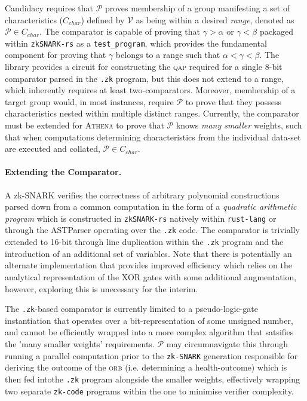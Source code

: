 \documentclass{article}
\begin{document}
				Candidacy requires that $\mathcal{P}$ proves membership of a group manifesting a set of characteristics ($C_{char}$) defined by $\mathcal{V}$ as being  within a desired \textit{range}, denoted as $\mathcal{P} \in C_{char}$. The comparator is capable of proving that $\gamma > \alpha$ or $\gamma < \beta$ packaged within \texttt{zkSNARK-rs} as a \texttt{test\_program}, which provides the fundamental component for proving that $\gamma$ belongs to a range such that $\alpha < \gamma < \beta$. The library provides a circuit for constructing the \textsc{qap} required for a single 8-bit comparator parsed in the \texttt{.zk} program, but this does not extend to a range, which inherently requires at least two-comparators. Moreover, membership of a target group would, in most instances, require $\mathcal{P}$ to prove that they possess characteristics nested within multiple distinct ranges. Currently, the comparator must be extended for \textsc{Athena} to prove that $\mathcal{P}$ knows \textit{many smaller} weights, such that when computations determining characteristics from the individual data-set are executed and collated, $\mathcal{P} \in C_{char}$.
				
\pagebreak
						
					\paragraph{Extending the Comparator.} A zk-SNARK verifies the correctness of arbitrary polynomial constructions parsed down from a common computation in the form of a \textit{quadratic arithmetic program} which is constructed in \texttt{zkSNARK-rs} natively within \texttt{rust-lang} or through the ASTParser operating over the \texttt{.zk} code. The comparator is trivially extended to 16-bit through line duplication within the \texttt{.zk} program and the introduction of an additional set of variables. Note that there is potentially an alternate implementation that provides improved efficiency which relies on the analytical representation of the XOR gates with some additional augmentation, however, exploring this is unecessary for the interim. 
					
					The \texttt{.zk}-based comparator is currently limited to a pseudo-logic-gate instantiation that operates over a bit-representation of some unsigned number, and cannot be efficiently wrapped into a more complex algorithm that satsifies the 'many smaller weights' requirements. $\mathcal{P}$ may circumnavigate this through running a parallel computation prior to the \texttt{zk-SNARK} generation responsible for deriving the outcome of the \textsc{orb} (i.e. determining a health-outcome) which is then fed intothe \texttt{.zk} program alongside the smaller weights, effectively wrapping two separate \texttt{zk-code} programs within the one to minimise verifier complexity.
					
\end{document}
